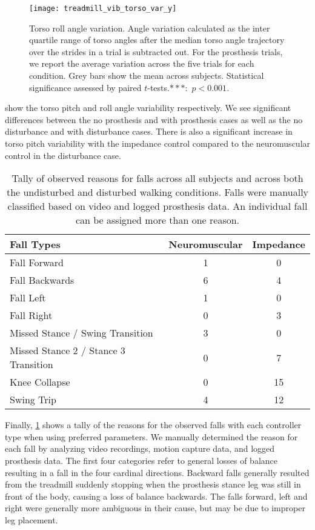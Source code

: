 \begin{figure}[t]
    \centering 
    \texttt{[image: treadmill\_vib\_torso\_var\_y]}
    \caption[Torso roll angle variation]{Torso roll angle variation. Angle
    variation calculated as the inter quartile range of torso angles after the
    median torso angle trajectory over the strides in a trial is subtracted out.
    For the prosthesis trials, we report the average variation across the five
    trials for each condition.  Grey bars show the mean across subjects.
    Statistical significance assessed by paired $t$-tests.$***$:~$p <
    0.001$.}\label{fig:treadmill_exp_torso_var_y}
\end{figure}

 show the
torso pitch and roll angle variability respectively. We see significant
differences between the no prosthesis and with prosthesis cases as well as the
no disturbance and with disturbance cases. There is also a significant increase
in torso pitch variability with the impedance control compared to the
neuromuscular control in the disturbance case.

\begin{table}[t]
  \begin{center}
    \begin{tabular}{lcc}
      Fall Types & Neuromuscular & Impedance \\
      \midrule
      Fall Forward &  1 &  0 \\
      Fall Backwards &  6 &  4 \\
      Fall Left &  1 &  0 \\
      Fall Right &  0 &  3 \\
      Missed Stance / Swing Transition &  3 &  0 \\
      Missed Stance 2 / Stance 3 Transition &  0 &  7 \\
      Knee Collapse & 0 & 15 \\
      Swing Trip & 4 & 12 \\
    \end{tabular}
  \end{center}
  \caption[Tally of observed reasons for falls]{Tally of observed reasons for
  falls across all subjects and across both the undisturbed and disturbed
  walking conditions. Falls were manually classified based on video and logged
  prosthesis data. An individual fall can be assigned more than one
  reason.}\label{tab:treadmill_exp_fall_reasons}
\end{table}
Finally, \cref{tab:treadmill_exp_fall_reasons} shows a tally of the reasons for
the observed falls with each controller type when using preferred parameters.
We manually determined the reason for each fall by analyzing video recordings,
motion capture data, and logged prosthesis data. The first four categories refer
to general losses of balance resulting in a fall in the four cardinal
directions. Backward falls generally resulted from the treadmill suddenly
stopping when the prosthesis stance leg was still in front of the body, causing
a loss of balance backwards. The falls forward, left and right were generally
more ambiguous in their cause, but may be due to improper leg placement. 

